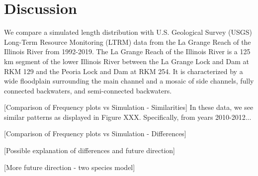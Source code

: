 \documentclass[preprint,review,12pt,authoryear]{elsarticle}
\begin{document}
\section{Discussion}


We compare a simulated length distribution with U.S. Geological Survey (USGS) Long-Term Resource Monitoring (LTRM) data from the La Grange Reach of the Illinois River from 1992-2019. The La Grange Reach of the Illinois River is a 125 km segment of the lower Illinois River between the La Grange Lock and Dam at RKM 129 and the Peoria Lock and Dam at RKM 254. It is characterized by a wide floodplain surrounding the main channel and a mosaic of side channels, fully connected backwaters, and semi-connected backwaters.

[Comparison of Frequency plots vs Simulation - Similarities]
In these data, we see similar patterns as displayed in Figure XXX.  Specifically, from years 2010-2012...


[Comparison of Frequency plots vs Simulation - Differences]

[Possible explanation of differences and future direction]


[More future direction - two species model]
\end{document}

